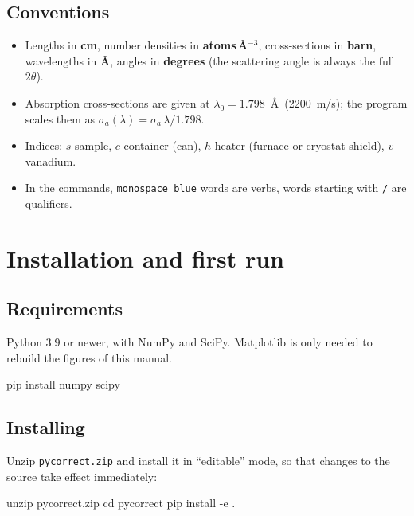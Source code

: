 \documentclass[11pt,a4paper]{report}
\newcommand{\cmd}[1]{\texttt{\color{accent}#1}}
\newcommand{\code}[1]{\texttt{#1}}
\newcommand{\file}[1]{\texttt{#1}}
\begin{document}
\section{Conventions}

\begin{itemize}
  \item Lengths in \textbf{cm}, number densities in \textbf{atoms\,\AA$^{-3}$},
        cross-sections in \textbf{barn}, wavelengths in \textbf{\AA}, angles in
        \textbf{degrees} (the scattering angle is always the full $2\theta$).
  \item Absorption cross-sections are given at $\lambda_0 = 1.798$~\AA\
        (2200~m/s); the program scales them as $\sigma_a(\lambda) =
        \sigma_a\,\lambda/1.798$.
  \item Indices: $s$ sample, $c$ container (can), $h$ heater (furnace or
        cryostat shield), $v$ vanadium.
  \item In the commands, \cmd{monospace blue} words are verbs, words starting
        with \code{/} are qualifiers.
\end{itemize}

\chapter{Installation and first run}

\section{Requirements}

Python 3.9 or newer, with NumPy and SciPy. Matplotlib is only needed to rebuild
the figures of this manual.

\begin{shell}
pip install numpy scipy
\end{shell}

\section{Installing}

Unzip \file{pycorrect.zip} and install it in ``editable'' mode, so that changes
to the source take effect immediately:

\begin{shell}
unzip pycorrect.zip
cd pycorrect
pip install -e .
\end{shell}
\end{document}
